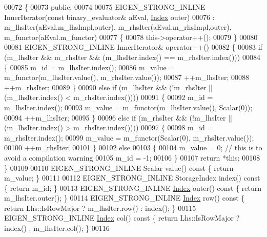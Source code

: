 \begin{DoxyCode}
00072   \{
00073   \textcolor{keyword}{public}:
00074     
00075     EIGEN\_STRONG\_INLINE InnerIterator(\textcolor{keyword}{const} binary\_evaluator& aEval, \hyperlink{namespace_eigen_a62e77e0933482dafde8fe197d9a2cfde}{Index} outer)
00076       : m\_lhsIter(aEval.m\_lhsImpl,outer), m\_rhsIter(aEval.m\_rhsImpl,outer), m\_functor(aEval.m\_functor)
00077     \{
00078       this->operator++();
00079     \}
00080 
00081     EIGEN\_STRONG\_INLINE InnerIterator& operator++()
00082     \{
00083       \textcolor{keywordflow}{if} (m\_lhsIter && m\_rhsIter && (m\_lhsIter.index() == m\_rhsIter.index()))
00084       \{
00085         m\_id = m\_lhsIter.index();
00086         m\_value = m\_functor(m\_lhsIter.value(), m\_rhsIter.value());
00087         ++m\_lhsIter;
00088         ++m\_rhsIter;
00089       \}
00090       \textcolor{keywordflow}{else} \textcolor{keywordflow}{if} (m\_lhsIter && (!m\_rhsIter || (m\_lhsIter.index() < m\_rhsIter.index())))
00091       \{
00092         m\_id = m\_lhsIter.index();
00093         m\_value = m\_functor(m\_lhsIter.value(), Scalar(0));
00094         ++m\_lhsIter;
00095       \}
00096       \textcolor{keywordflow}{else} \textcolor{keywordflow}{if} (m\_rhsIter && (!m\_lhsIter || (m\_lhsIter.index() > m\_rhsIter.index())))
00097       \{
00098         m\_id = m\_rhsIter.index();
00099         m\_value = m\_functor(Scalar(0), m\_rhsIter.value());
00100         ++m\_rhsIter;
00101       \}
00102       \textcolor{keywordflow}{else}
00103       \{
00104         m\_value = 0; \textcolor{comment}{// this is to avoid a compilation warning}
00105         m\_id = -1;
00106       \}
00107       \textcolor{keywordflow}{return} *\textcolor{keyword}{this};
00108     \}
00109 
00110     EIGEN\_STRONG\_INLINE Scalar value()\textcolor{keyword}{ const }\{ \textcolor{keywordflow}{return} m\_value; \}
00111 
00112     EIGEN\_STRONG\_INLINE StorageIndex index()\textcolor{keyword}{ const }\{ \textcolor{keywordflow}{return} m\_id; \}
00113     EIGEN\_STRONG\_INLINE \hyperlink{namespace_eigen_a62e77e0933482dafde8fe197d9a2cfde}{Index} outer()\textcolor{keyword}{ const }\{ \textcolor{keywordflow}{return} m\_lhsIter.outer(); \}
00114     EIGEN\_STRONG\_INLINE \hyperlink{namespace_eigen_a62e77e0933482dafde8fe197d9a2cfde}{Index} row()\textcolor{keyword}{ const }\{ \textcolor{keywordflow}{return} Lhs::IsRowMajor ? m\_lhsIter.row() : index(); \}
00115     EIGEN\_STRONG\_INLINE \hyperlink{namespace_eigen_a62e77e0933482dafde8fe197d9a2cfde}{Index} col()\textcolor{keyword}{ const }\{ \textcolor{keywordflow}{return} Lhs::IsRowMajor ? index() : m\_lhsIter.col(); \}
00116 

\end{DoxyCode}
